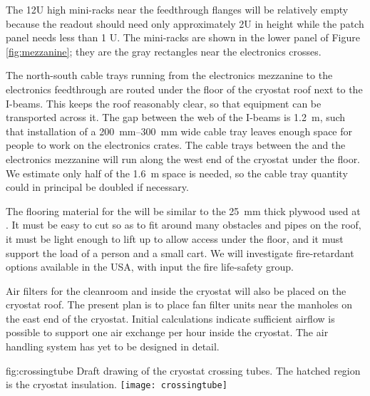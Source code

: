 The 12U high mini-racks near the feedthrough flanges will be relatively empty because the  readout should need only approximately 2U in height while the  patch panel needs less than 1 U. The mini-racks are shown in the lower panel of Figure \ref{fig:mezzanine}; %
they are the gray rectangles near the electronics crosses.

The north-south cable trays  running from the electronics mezzanine to the electronics feedthrough are routed under the floor of the cryostat roof next to the %
I-beams. This keeps the roof reasonably clear, so that equipment can be transported across it. %
The gap between the web of the I-beams is \SI{1.2}{m}, such that %
installation of a \SIrange{200}{300}{mm} wide cable tray %
leaves enough space %
for people to work on the electronics crates. 
The cable trays between the  and the electronics mezzanine will run along the west end of the cryostat under the floor.  
We estimate only half of the \SI{1.6}{m} space is needed, so the cable tray quantity could in principal be doubled if necessary. 

The flooring material for the  %
will be similar to the \SI{25}{mm} thick plywood used at . %
It must be easy to cut so as to fit around many obstacles and pipes on the roof, it must be light enough to lift up to allow access under the floor, and it must support the load of a person %
and a small cart. 
We will investigate %
fire-retardant options available %
in the USA, %
with input the  fire life-safety group. 

Air filters for the cleanroom and inside the cryostat will also be placed on the cryostat roof. The present plan is to place fan filter units near the manholes on the east end of the cryostat. Initial calculations indicate sufficient airflow is possible to support one air exchange per hour inside the cryostat. The air handling system has yet to be designed in detail.


\begin{dunefigure}{fig:crossingtube}
  {Draft drawing of the cryostat crossing tubes. The hatched region is the cryostat insulation.}
\texttt{[image: crossingtube]}
\end{dunefigure}
 
